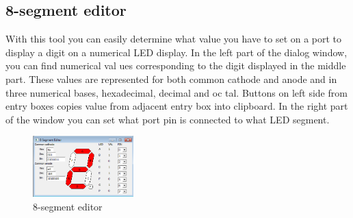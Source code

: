 \subsection{8-segment editor}
With this tool you can easily determine what
value you have to set on a port to display a digit
on a numerical LED display. In the left part of
the dialog window, you can find numerical val
ues corresponding to the digit displayed in the
middle part. These values are represented for
both common cathode and anode and in three
numerical bases, hexadecimal, decimal and oc
tal. Buttons on left side from entry boxes copies
value from adjacent entry box into clipboard.
In the right part of the window you can set what port pin is connected to
what LED segment.
        \begin{figure}
            \centering{}
            \includegraphics[width=110pt]{img/8segment.png}
            \caption{8-segment editor}
        \end{figure}
